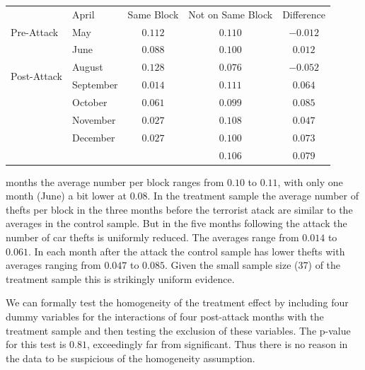\documentclass[10pt]{article}
\begin{document}
\begin{tabular}{llccc}
\hline\hline
\multirow{3}{*}{Pre-Attack} & April & Same Block & Not on Same Block & Difference \\
\cline { 3 - 5 }
 & May & $0.112$ & $0.110$ & $-0.012$ \\
 & June & $0.088$ & $0.100$ & $0.012$ \\
\multirow{2}{*}{Post-Attack} & August & $0.128$ & $0.076$ & $-0.052$ \\
 & September & $0.014$ & $0.111$ & $0.064$ \\
 & October & $0.061$ & $0.099$ & $0.085$ \\
 & November & $0.027$ & $0.108$ & $0.047$ \\
 & December & $0.027$ & $0.100$ & $0.073$ \\
 &  &  & $0.106$ & $0.079$ \\
\hline
\end{tabular}

months the average number per block ranges from $0.10$ to $0.11$, with only one month (June) a bit lower at $0.08$. In the treatment sample the average number of thefts per block in the three months before the terrorist atack are similar to the averages in the control sample. But in the five months following the attack the number of car thefts is uniformly reduced. The averages range from $0.014$ to $0.061$. In each month after the attack the control sample has lower thefts with averages ranging from $0.047$ to $0.085$. Given the small sample size (37) of the treatment sample this is strikingly uniform evidence.

We can formally test the homogeneity of the treatment effect by including four dummy variables for the interactions of four post-attack months with the treatment sample and then testing the exclusion of these variables. The $\mathrm{p}$-value for this test is $0.81$, exceedingly far from significant. Thus there is no reason in the data to be suspicious of the homogeneity assumption.
\end{document}
